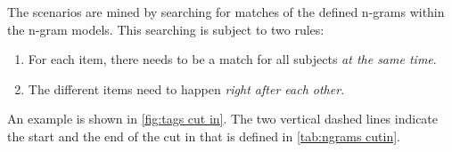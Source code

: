 The scenarios are mined by searching for matches of the defined n-grams within the n-gram models. 
This searching is subject to two rules:
\begin{enumerate}
	\item For each item, there needs to be a match for all subjects \emph{at the same time}.
	\item The different items need to happen \emph{right after each other}. 
\end{enumerate}
An example is shown in \cref{fig:tags cut in}. 
The two vertical dashed lines indicate the start and the end of the cut in that is defined in \cref{tab:ngrams cutin}.
\cendb

\begin{figure*}
	\centering
	
	\caption{\cstartc Example of tags describing a cut in. Note that only the tags that are relevant for the cut in, as defined in \cref{tab:ngrams cutin}, are shown.\cendc}
	\label{fig:tags cut in}
\end{figure*}



